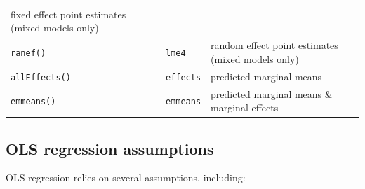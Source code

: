 \documentclass[]{book}
\begin{document}
\begin{longtable}[]{@{}lll@{}}
\begin{minipage}[t]{0.59\columnwidth}
fixed effect point estimates (mixed models only)\strut
\end{minipage}\tabularnewline
\begin{minipage}[t]{0.16\columnwidth}\raggedright
\texttt{ranef()}\strut
\end{minipage} & \begin{minipage}[t]{0.17\columnwidth}\raggedright
\texttt{lme4}\strut
\end{minipage} & \begin{minipage}[t]{0.59\columnwidth}\raggedright
random effect point estimates (mixed models only)\strut
\end{minipage}\tabularnewline
\begin{minipage}[t]{0.16\columnwidth}\raggedright
\texttt{allEffects()}\strut
\end{minipage} & \begin{minipage}[t]{0.17\columnwidth}\raggedright
\texttt{effects}\strut
\end{minipage} & \begin{minipage}[t]{0.59\columnwidth}\raggedright
predicted marginal means\strut
\end{minipage}\tabularnewline
\begin{minipage}[t]{0.16\columnwidth}\raggedright
\texttt{emmeans()}\strut
\end{minipage} & \begin{minipage}[t]{0.17\columnwidth}\raggedright
\texttt{emmeans}\strut
\end{minipage} & \begin{minipage}[t]{0.59\columnwidth}\raggedright
predicted marginal means \& marginal effects\strut
\end{minipage}\tabularnewline
\bottomrule
\end{longtable}

\hypertarget{ols-regression-assumptions}{%
\subsection{OLS regression assumptions}\label{ols-regression-assumptions}}

OLS regression relies on several assumptions, including:
\end{document}
